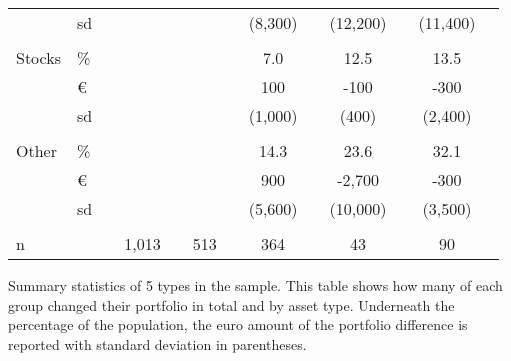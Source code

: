 \begin{table}[]
{\begin{threeparttable}
\begin{tabular}{ll|ccccccccccc}
				& sd &  &  &  &  &  & (8,300) &  & (12,200) &  & (11,400) &  \\
				&  &  &  &  &  &  &  &  &  &  &  &  \\
				Stocks & \% &  &  &  &  &  & 7.0 &  & 12.5 &  & 13.5 &  \\
				& \euro &  &  &  &  &  & 100 &  & -100 &  & -300 &  \\
				& sd &  &  &  &  &  & (1,000) &  & (400) &  & (2,400) &  \\
				&  &  &  &  &  &  &  &  &  &  &  &  \\
				Other & \% &  &  &  &  &  & 14.3 &  & 23.6 &  & 32.1 &  \\
				& \euro &  &  &  &  &  & 900 &  & -2,700 &  & -300 &  \\
				& sd &  &  &  &  &  & (5,600) &  & (10,000) &  & (3,500) &  \\ \hline
				&  &  &  &  &  &  &  &  &  &  &  &  \\
				n &  &  & 1,013 &  & 513 &  & 364 &  & 43 &  & 90 &  \\ \hline \hline
			\end{tabular}
			\begin{tablenotes}\footnotesize
				\item[] Summary statistics of 5 types in the sample. This table shows how many of each group changed their portfolio in total and by asset type. Underneath the percentage of the population, the euro amount of the portfolio difference is reported with standard deviation in parentheses.
			\end{tablenotes}
		\end{threeparttable}
	}
\end{table}
